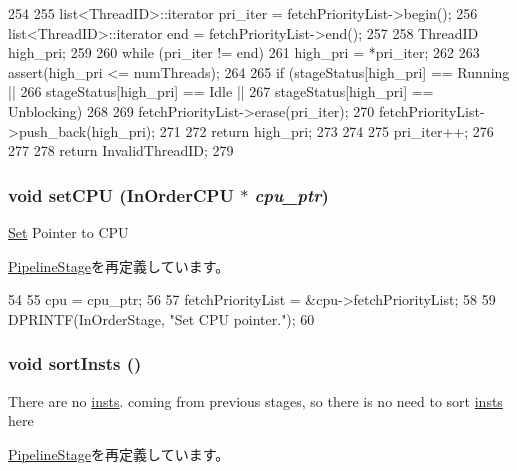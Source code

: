 \begin{DoxyCode}
254 {
255     list<ThreadID>::iterator pri_iter = fetchPriorityList->begin();
256     list<ThreadID>::iterator end      = fetchPriorityList->end();
257 
258     ThreadID high_pri;
259 
260     while (pri_iter != end) {
261         high_pri = *pri_iter;
262 
263         assert(high_pri <= numThreads);
264 
265         if (stageStatus[high_pri] == Running ||
266             stageStatus[high_pri] == Idle ||
267             stageStatus[high_pri] == Unblocking){
268 
269             fetchPriorityList->erase(pri_iter);
270             fetchPriorityList->push_back(high_pri);
271 
272             return high_pri;
273         }
274 
275         pri_iter++;
276     }
277 
278     return InvalidThreadID;
279 }
\end{DoxyCode}
\hypertarget{classFirstStage_a6fd0f914e19bcfb6d9f28e537ad956d5}{
\subsubsection[{setCPU}]{\setlength{\rightskip}{0pt plus 5cm}void setCPU ({\bf InOrderCPU} $\ast$ {\em cpu\_\-ptr})}}
\label{classFirstStage_a6fd0f914e19bcfb6d9f28e537ad956d5}
\hyperlink{classSet}{Set} Pointer to CPU 

\hyperlink{classPipelineStage_a6fd0f914e19bcfb6d9f28e537ad956d5}{PipelineStage}を再定義しています。


\begin{DoxyCode}
54 {
55     cpu = cpu_ptr;
56 
57     fetchPriorityList = &cpu->fetchPriorityList;
58 
59     DPRINTF(InOrderStage, "Set CPU pointer.\n");
60 }
\end{DoxyCode}
\hypertarget{classFirstStage_a9ff2aa32ab0f40674cb3518108d62f8e}{
\subsubsection[{sortInsts}]{\setlength{\rightskip}{0pt plus 5cm}void sortInsts ()}}
\label{classFirstStage_a9ff2aa32ab0f40674cb3518108d62f8e}
There are no \hyperlink{namespaceinsts}{insts}. coming from previous stages, so there is no need to sort \hyperlink{namespaceinsts}{insts} here 

\hyperlink{classPipelineStage_a9ff2aa32ab0f40674cb3518108d62f8e}{PipelineStage}を再定義しています。


